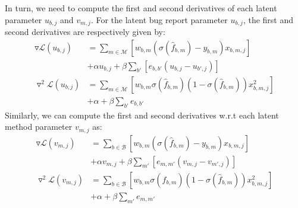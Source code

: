 In turn, we need to compute the first and second derivatives of each latent parameter $u_{b,j}$ and $v_{m,j}$. For the latent bug report parameter $u_{b,j}$, the first and second derivatives are respectively given by:
\begin{align}
\label{eqn:grad_u}
\triangledown \mathcal{L}(u_{b,j}) &= \sum_{m \in \mathcal{M}} \left[ w_{b,m} (\sigma(\hat{f}_{b,m}) - y_{b,m}) x_{b,m,j} \right] \nonumber \\
&+ \alpha u_{b,j} + \beta \sum_{b'} \left[ e_{b,b'} \left( u_{b,j} - u_{b',j} \right) \right] \\
\label{eqn:hess_u}
\triangledown^2 \mathcal{L}(u_{b,j}) &= \sum_{m \in \mathcal{M}} \left[ w_{b,m} \sigma(\hat{f}_{b,m}) ( 1 - \sigma(\hat{f}_{b,m}) ) x_{b,m,j}^2 \right] \nonumber \\
&+ \alpha + \beta \sum_{b'} e_{b,b'}
\end{align}
Similarly, we can compute the first and second derivatives w.r.t each latent method parameter $v_{m,j}$ as:
\begin{align}
\label{eqn:grad_v}
\triangledown \mathcal{L}(v_{m,j}) &= \sum_{b \in \mathcal{B}} \left[ w_{b,m} (\sigma(\hat{f}_{b,m}) - y_{b,m}) x_{b,m,j} \right] \nonumber \\
& + \alpha v_{m,j} + \beta \sum_{m'} \left[ e_{m,m'} \left( v_{m,j} - v_{m',j} \right) \right] \\
\label{eqn:hess_v}
\triangledown^2 \mathcal{L}(v_{m,j}) &= \sum_{b \in \mathcal{B}} \left[ w_{b,m} \sigma(\hat{f}_{b,m}) ( 1 - \sigma(\hat{f}_{b,m})) x_{b,m,j}^2 \right] \nonumber \\
& + \alpha + \beta \sum_{m'} e_{m,m'}
\end{align}

